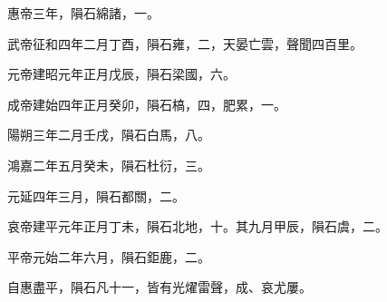 \begin{pinyinscope}
惠帝三年，隕石綿諸，一。

武帝征和四年二月丁酉，隕石雍，二，天晏亡雲，聲聞四百里。

元帝建昭元年正月戊辰，隕石梁國，六。

成帝建始四年正月癸卯，隕石槁，四，肥累，一。

陽朔三年二月壬戌，隕石白馬，八。

鴻嘉二年五月癸未，隕石杜衍，三。

元延四年三月，隕石都關，二。

哀帝建平元年正月丁未，隕石北地，十。其九月甲辰，隕石虞，二。

平帝元始二年六月，隕石鉅鹿，二。

自惠盡平，隕石凡十一，皆有光燿雷聲，成、哀尤屢。


\end{pinyinscope}